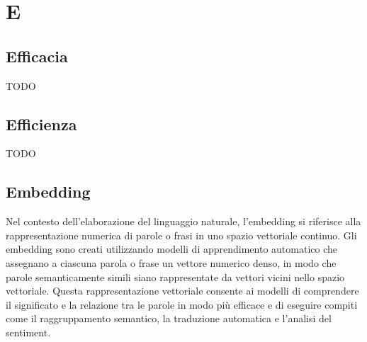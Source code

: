 \section{E}

\vspace{2em}
\subsection*{Efficacia}
TODO

\vspace{2em}
\subsection*{Efficienza}
TODO

\vspace{2em}
\subsection*{Embedding}
\par Nel contesto dell'elaborazione del linguaggio naturale, l'embedding si riferisce alla rappresentazione numerica di parole o frasi in uno spazio vettoriale continuo. Gli embedding sono creati utilizzando modelli di apprendimento automatico che assegnano a ciascuna parola o frase un vettore numerico denso, in modo che parole semanticamente simili siano rappresentate da vettori vicini nello spazio vettoriale. Questa rappresentazione vettoriale consente ai modelli di comprendere il significato e la relazione tra le parole in modo più efficace e di eseguire compiti come il raggruppamento semantico, la traduzione automatica e l'analisi del sentiment.
